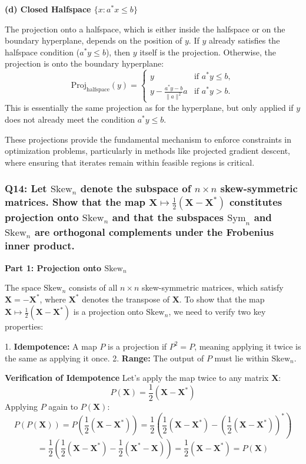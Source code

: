 \documentclass[8pt]{article}
\begin{document}
\textbf{(d) Closed Halfspace \(\{x : a^* x \leq b\}\)}

The projection onto a halfspace, which is either inside the halfspace or on the boundary hyperplane, depends on the position of \(y\). If \(y\) already satisfies the halfspace condition (\(a^* y \leq b\)), then \(y\) itself is the projection. Otherwise, the projection is onto the boundary hyperplane:
\[ \text{Proj}_{\text{halfspace}}(y) = \begin{cases} 
y & \text{if } a^* y \leq b, \\
y - \frac{a^* y - b}{\|a\|^2} a & \text{if } a^* y > b.
\end{cases} \]
This is essentially the same projection as for the hyperplane, but only applied if \(y\) does not already meet the condition \(a^* y \leq b\).

These projections provide the fundamental mechanism to enforce constraints in optimization problems, particularly in methods like projected gradient descent, where ensuring that iterates remain within feasible regions is critical.

\subsubsection*{Q14: Let \(\mathrm{Skew}_n\) denote the subspace of \(n \times n\) skew-symmetric matrices. Show that the map \(\mathbf{X} \mapsto \frac{1}{2} (\mathbf{X} - \mathbf{X}^*)\) constitutes projection onto \(\mathrm{Skew}_n\) and that the subspaces \(\mathrm{Sym}_n\) and \(\mathrm{Skew}_n\) are orthogonal complements under the Frobenius inner product.}

\textbf{Part 1: Projection onto \(\mathrm{Skew}_n\)}

The space \(\mathrm{Skew}_n\) consists of all \(n \times n\) skew-symmetric matrices, which satisfy \(\mathbf{X} = -\mathbf{X}^*\), where \(\mathbf{X}^*\) denotes the transpose of \(\mathbf{X}\). To show that the map \(\mathbf{X} \mapsto \frac{1}{2} (\mathbf{X} - \mathbf{X}^*)\) is a projection onto \(\mathrm{Skew}_n\), we need to verify two key properties:

1. \textbf{Idempotence:} A map \(P\) is a projection if \(P^2 = P\), meaning applying it twice is the same as applying it once.
2. \textbf{Range: }The output of \(P\) must lie within \(\mathrm{Skew}_n\).

\textbf{Verification of Idempotence}
Let's apply the map twice to any matrix \(\mathbf{X}\):
\[
P(\mathbf{X}) = \frac{1}{2} (\mathbf{X} - \mathbf{X}^*)
\]
Applying \(P\) again to \(P(\mathbf{X})\):
\[
P(P(\mathbf{X})) = P\left(\frac{1}{2} (\mathbf{X} - \mathbf{X}^*)\right) = \frac{1}{2} \left(\frac{1}{2} (\mathbf{X} - \mathbf{X}^*) - \left(\frac{1}{2} (\mathbf{X} - \mathbf{X}^*)\right)^*\right)
\]
\[
= \frac{1}{2} \left(\frac{1}{2} (\mathbf{X} - \mathbf{X}^*) - \frac{1}{2} (\mathbf{X}^* - \mathbf{X})\right) = \frac{1}{2} (\mathbf{X} - \mathbf{X}^*) = P(\mathbf{X})
\]
\end{document}
